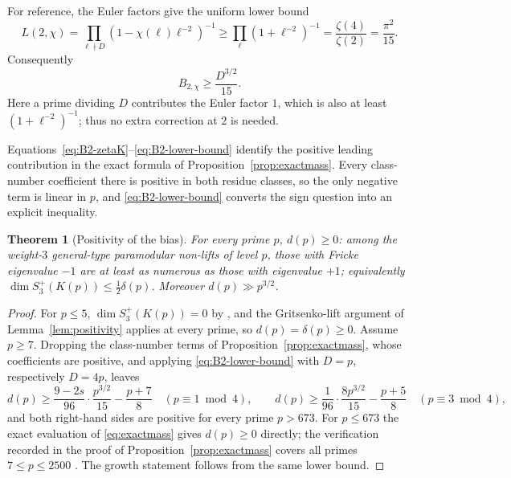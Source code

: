 \documentclass[11pt]{amsart}
\theoremstyle{plain}
\newtheorem{theorem}{Theorem}[section]
\theoremstyle{definition}
\begin{document}
	For reference, the Euler factors give the uniform lower bound
	\begin{equation}\label{eq:L2-lower-bound}
		L(2,\chi)
		=\prod_{\ell\nmid D}(1-\chi(\ell)\ell^{-2})^{-1}
		\geq\prod_{\ell}(1+\ell^{-2})^{-1}
		=\frac{\zeta(4)}{\zeta(2)}=\frac{\pi^2}{15}.
	\end{equation}
	Consequently
	\begin{equation}\label{eq:B2-lower-bound}
		B_{2,\chi}\geq\frac{D^{3/2}}{15}.
	\end{equation}
	Here a prime dividing $D$ contributes the Euler factor $1$, which is also at
	least $(1+\ell^{-2})^{-1}$; thus no extra correction at $2$ is needed.
	
	Equations~\eqref{eq:B2-zetaK}--\eqref{eq:B2-lower-bound} identify the
	positive leading contribution in the exact formula of
	Proposition~\ref{prop:exactmass}.  Every class-number coefficient
	there is positive in both residue classes, so the only negative term is
	linear in $p$, and \eqref{eq:B2-lower-bound} converts the sign question
	into an explicit inequality.
	
	\begin{theorem}[Positivity of the bias]\label{thm:bias}
		For every prime $p$, $d(p)\ge0$: among the weight-$3$ general-type
		paramodular non-lifts of level $p$, those with Fricke eigenvalue $-1$
		are at least as numerous as those with eigenvalue $+1$; equivalently
		$\dim S_3^+(K(p))\le\tfrac12\delta(p)$. Moreover $d(p)\gg p^{3/2}$.
	\end{theorem}
	
	\begin{proof}
		For $p\le5$, $\dim S_3^{+}(K(p))=0$ by \cite[Prop.~8.2]{Ibukiyama-dim},
		and the Gritsenko-lift argument of Lemma~\ref{lem:positivity} applies at
		every prime, so $d(p)=\delta(p)\ge0$. Assume $p\ge7$.
		Dropping the class-number terms of Proposition~\ref{prop:exactmass},
		whose coefficients are positive, and applying \eqref{eq:B2-lower-bound}
		with $D=p$, respectively $D=4p$, leaves
		\[
		d(p)\ge\frac{9-2s}{96}\cdot\frac{p^{3/2}}{15}-\frac{p+7}{8}
		\quad(p\equiv1\bmod4),
		\qquad
		d(p)\ge\frac{1}{96}\cdot\frac{8p^{3/2}}{15}-\frac{p+5}{8}
		\quad(p\equiv3\bmod4),
		\]
		and both right-hand sides are positive for every prime $p>673$. For
		$p\le673$ the exact evaluation of \eqref{eq:exactmass} gives
		$d(p)\ge0$ directly; the verification recorded in the proof of
		Proposition~\ref{prop:exactmass} covers all primes $7\le p\le2500$
		\cite{artifact}. The growth statement follows from the same lower
		bound.
	\end{proof}
	
\end{document}

